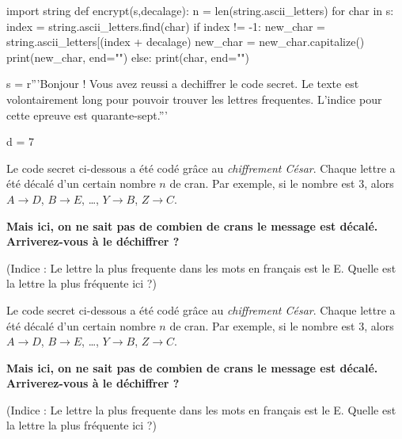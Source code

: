 \documentclass{exos}
\begin{document}
\begin{pycode}
import string
def encrypt(s,decalage):
  n = len(string.ascii_letters)
  for char in s:
    index = string.ascii_letters.find(char)
    if index != -1:
      new_char = string.ascii_letters[(index + decalage) %
      new_char = new_char.capitalize()
      print(new_char, end="")
    else:
      print(char, end="")

s = r'''Bonjour ! Vous avez reussi a dechiffrer le code secret. Le texte est volontairement long pour pouvoir trouver les lettres frequentes. L'indice pour cette epreuve est quarante-sept.'''

d = 7
\end{pycode}

Le code secret ci-dessous a été codé grâce au \textit{chiffrement César}. Chaque lettre a été décalé d'un certain nombre $n$ de cran. Par exemple, si le nombre est $3$, alors $A \to D$, $B \to E$, \dots, $Y \to B$, $Z \to C$.

\textbf{Mais ici, on ne sait pas de combien de crans le message est décalé. Arriverez-vous à le déchiffrer ?}

\vspace*{1cm}


\vspace*{1cm}

(Indice : Le lettre la plus frequente dans les mots en français est le E. Quelle est la lettre la plus fréquente ici ?)

\vspace*{1cm}
\hrulefill
\vspace*{1cm}

Le code secret ci-dessous a été codé grâce au \textit{chiffrement César}. Chaque lettre a été décalé d'un certain nombre $n$ de cran. Par exemple, si le nombre est $3$, alors $A \to D$, $B \to E$, \dots, $Y \to B$, $Z \to C$.

\textbf{Mais ici, on ne sait pas de combien de crans le message est décalé. Arriverez-vous à le déchiffrer ?}

\vspace*{1cm}


\vspace*{1cm}

(Indice : Le lettre la plus frequente dans les mots en français est le E. Quelle est la lettre la plus fréquente ici ?)

\vspace*{1cm}
\hrulefill
\vspace*{1cm}
\end{document}
